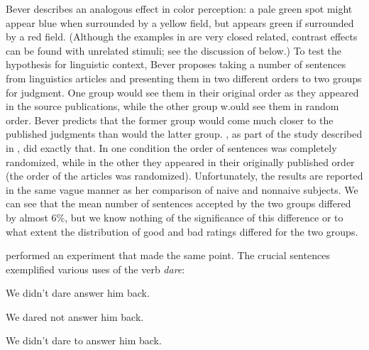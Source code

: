 \noindent
Bever describes an analogous effect in color perception: a pale green spot might appear blue when surrounded by a yellow field, but appears green if surrounded by a red field. (Although the examples in  are very closed related, contrast effects can be found with unrelated stimuli; see the discussion of \citet{Snow1975} below.) To test the hypothesis for linguistic context, Bever proposes taking a number of sentences  from linguistics articles and presenting them in two different orders to two groups for judgment. One group would see them in their original order as they appeared in the source publications, while the other group w.ould see them in random order. Bever predicts that the former group would come much closer to the published judgments than would the latter group. \citet{Spencer1973}, as part of the study described in , did exactly that. In one condition the order of sentences was completely randomized, while in the other they appeared in their originally published order (the order of the articles was randomized). Unfortunately, the results are reported in the same vague manner as her comparison of naive and nonnaive subjects. We can see that the mean number of sentences accepted by the two groups differed by almost 6\%, but we know nothing of the significance of this difference or to what extent the distribution of good and bad ratings differed for the two groups.

\citet{Greenbaum1976a} performed an experiment that made the same point.
The crucial sentences exemplified various uses of the verb \textit{dare}:

\ea\label{ex:5:13} 
We didn't dare answer him back.
\z

\ea\label{ex:5:14} 
We dared not answer him back.
\z

\ea\label{ex:5:15} 
We didn't dare to answer him back.
\z

